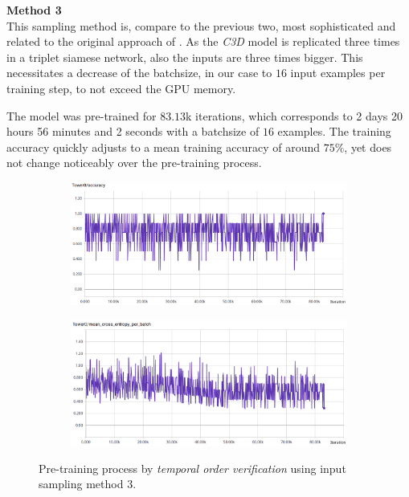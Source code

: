 \textbf{Method 3}\\
This sampling method is, compare to the previous two, most sophisticated and related to the original approach of \textcite{misra_shuffle_2016}.
As the \textit{C3D} model is replicated three times in a triplet siamese network, also the inputs are three times bigger.
This necessitates a decrease of the batchsize, in our case to $16$ input examples per training step, to not exceed the GPU memory.

The model was pre-trained for $83.13$k iterations, which corresponds to 2 days 20 hours 56 minutes and 2 seconds with a batchsize of $16$ examples.
The training accuracy quickly adjusts to a mean training accuracy of around $75\%$, yet does not change noticeably over the pre-training process.

\begin{figure}[H]
    \begin{subfigure}[c]{\textwidth}
    \centering
    \includegraphics[width=\textwidth]{img_evaluation/pretrain3/tower0accuracy}
    \end{subfigure}
    \begin{subfigure}[c]{\textwidth}
    \includegraphics[width=\textwidth]{img_evaluation/pretrain3/tower0crossentropy}
    \end{subfigure}
    \caption{Pre-training process by \textit{temporal order verification} using input sampling method 3.}
    \label{fig:pretrain3}
\end{figure}

